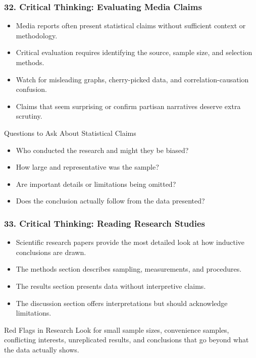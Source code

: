 \documentclass{beamer}
\begin{document}
\begin{frame}
\frametitle{32. Critical Thinking: Evaluating Media Claims}
\begin{itemize}
    \item Media reports often present statistical claims without sufficient context or methodology.
    \item Critical evaluation requires identifying the source, sample size, and selection methods.
    \item Watch for misleading graphs, cherry-picked data, and correlation-causation confusion.
    \item Claims that seem surprising or confirm partisan narratives deserve extra scrutiny.
\end{itemize}

\begin{alertblock}{Questions to Ask About Statistical Claims}
\begin{itemize}
    \item Who conducted the research and might they be biased?
    \item How large and representative was the sample?
    \item Are important details or limitations being omitted?
    \item Does the conclusion actually follow from the data presented?
\end{itemize}
\end{alertblock}
\end{frame}

\begin{frame}
\frametitle{33. Critical Thinking: Reading Research Studies}
\begin{itemize}
    \item Scientific research papers provide the most detailed look at how inductive conclusions are drawn.
    \item The methods section describes sampling, measurements, and procedures.
    \item The results section presents data without interpretive claims.
    \item The discussion section offers interpretations but should acknowledge limitations.
\end{itemize}

\begin{block}{Red Flags in Research}
Look for small sample sizes, convenience samples, conflicting interests, unreplicated results, and conclusions that go beyond what the data actually shows.
\end{block}
\end{frame}
\end{document}
